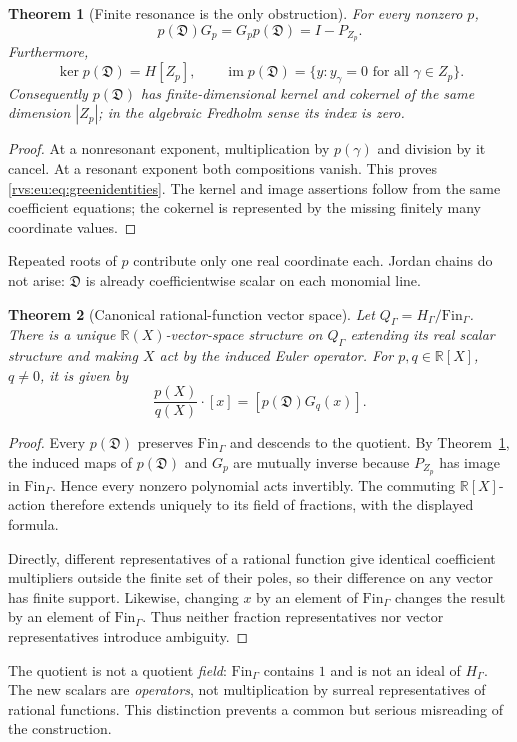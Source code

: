 \documentclass[11pt,letterpaper]{article}
\numberwithin{equation}{section}
\newtheorem{theorem}{Theorem}[section]
\theoremstyle{definition}
\theoremstyle{remark}
\newcommand{\R}{\mathbb{R}}
\newcommand{\im}{\operatorname{im}}
\newcommand{\EuD}{\mathfrak D}%
\newcommand{\FinS}[1]{\mathrm{Fin}_{#1}}%
\begin{document}
\begin{theorem}[Finite resonance is the only obstruction]\label{rvs:eu:thm:resonance}
For every nonzero $p$,
\begin{equation}\label{rvs:eu:eq:greenidentities}
 p(\EuD)G_p=G_pp(\EuD)=I-P_{Z_p}.
\end{equation}
Furthermore,
\[
 \ker p(\EuD)=H[Z_p],\qquad
 \im p(\EuD)=\{y:y_\gamma=0\text{ for all }\gamma\in Z_p\}.
\]
Consequently $p(\EuD)$ has finite-dimensional kernel and cokernel of the same dimension $|Z_p|$; in the algebraic Fredholm sense its index is zero.
\end{theorem}
\begin{proof}
At a nonresonant exponent, multiplication by $p(\gamma)$ and division by it cancel. At a resonant exponent both compositions vanish. This proves \eqref{rvs:eu:eq:greenidentities}. The kernel and image assertions follow from the same coefficient equations; the cokernel is represented by the missing finitely many coordinate values.
\end{proof}
Repeated roots of $p$ contribute only one real coordinate each. Jordan chains do not arise: $\EuD$ is already coefficientwise scalar on each monomial line.

\begin{theorem}[Canonical rational-function vector space]\label{rvs:eu:thm:rational}
Let $Q_\Gamma=H_\Gamma/\FinS{\Gamma}$. There is a unique $\R(X)$-vector-space structure on $Q_\Gamma$ extending its real scalar structure and making $X$ act by the induced Euler operator. For $p,q\in\R[X]$, $q\ne0$, it is given by
\begin{equation}\label{rvs:eu:eq:rationalaction}
 \frac{p(X)}{q(X)}\cdot[x]=[p(\EuD)G_q(x)].
\end{equation}
\end{theorem}
\begin{proof}
Every $p(\EuD)$ preserves $\FinS{\Gamma}$ and descends to the quotient. By Theorem~\ref{rvs:eu:thm:resonance}, the induced maps of $p(\EuD)$ and $G_p$ are mutually inverse because $P_{Z_p}$ has image in $\FinS{\Gamma}$. Hence every nonzero polynomial acts invertibly. The commuting $\R[X]$-action therefore extends uniquely to its field of fractions, with the displayed formula.

Directly, different representatives of a rational function give identical coefficient multipliers outside the finite set of their poles, so their difference on any vector has finite support. Likewise, changing $x$ by an element of $\FinS{\Gamma}$ changes the result by an element of $\FinS{\Gamma}$. Thus neither fraction representatives nor vector representatives introduce ambiguity.
\end{proof}
The quotient is not a quotient \emph{field}: $\FinS{\Gamma}$ contains $1$ and is not an ideal of $H_\Gamma$. The new scalars are \emph{operators}, not multiplication by surreal representatives of rational functions. This distinction prevents a common but serious misreading of the construction.
\end{document}
